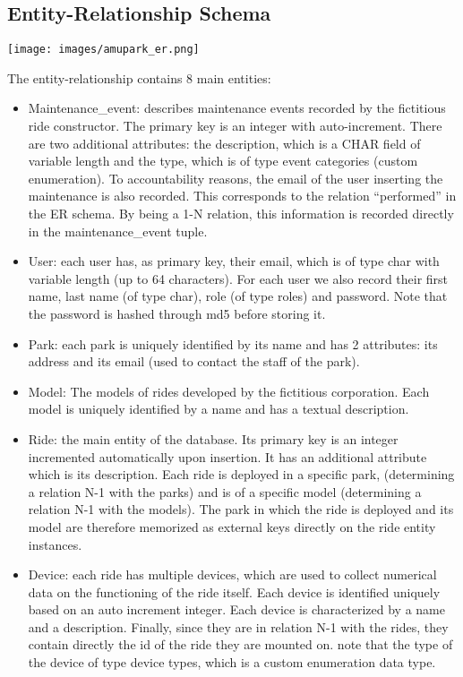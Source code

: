\subsection{Entity-Relationship Schema}

\texttt{[image: images/amupark\_er.png]}

\noindent The entity-relationship contains 8 main entities:
\begin{itemize}
    \item Maintenance\_event: describes maintenance events recorded by the fictitious ride constructor. The primary key is an integer with auto-increment. There are two additional attributes: the description, which is a CHAR field of variable length and the type, which is of type event categories (custom enumeration). To accountability reasons, the email of the user inserting the maintenance is also recorded. This corresponds to the relation “performed” in the ER schema. By being a 1-N relation, this information is recorded directly in the maintenance\_event tuple.
    \item User: each user has, as primary key, their email, which is of type char with variable length (up to 64 characters). For each user we also record their first name, last name (of type char), role (of type roles) and password. Note that the password is hashed through md5 before storing it.
    \item Park: each park is uniquely identified by its name and has 2 attributes: its address and its email (used to contact the staff of the park).
    \item  Model: The models of rides developed by the fictitious corporation. Each model is uniquely identified by a name and has a textual description.
    \item  Ride: the main entity of the database. Its primary key is an integer incremented automatically upon insertion. It has an additional attribute which is its description. Each ride is deployed in a specific park, (determining a relation N-1 with the parks) and is of a specific model (determining a relation N-1 with the models). The park in which the ride is deployed and its model are therefore memorized as external keys directly on the ride entity instances.
    \item  Device: each ride has multiple devices, which are used to collect numerical data on the functioning of the ride itself. Each device is identified uniquely based on an auto increment integer. Each device is characterized by a name and a description. Finally, since they are in relation N-1 with the rides, they contain directly the id of the ride they are mounted on. note that the type of the device of type device types, which is a custom enumeration data type.

\end{itemize}
